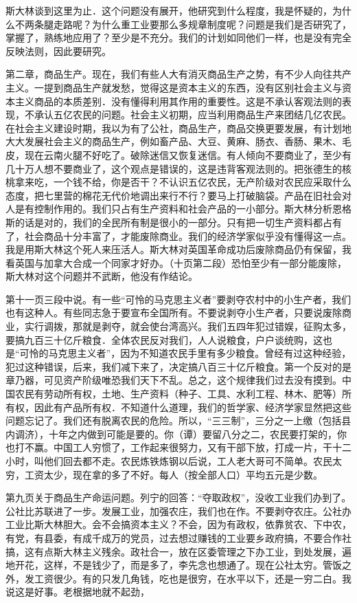 斯大林谈到这里为止．这个问题没有展开，他研究到什么程度，我是怀疑的，为什么不两条腿走路呢？为什么重工业要那么多规章制度呢？问题是我们是否研究了，掌握了，熟练地应用了？至少是不充分。我们的计划如同他们一样，也是没有完全反映法则，因此要研究。

第二章，商品生产。现在，我们有些人大有消灭商品生产之势，有不少人向往共产主义。一提到商品生产就发愁，觉得这是资本主义的东西，没有区别社会主义与资本主义商品的本质差别．没有懂得利用其作用的重要性。这是不承认客观法则的表现，不承认五亿农民的问题。社会主义初期，应当利用商品生产来团结几亿农民。在社会主义建设时期，我以为有了公社，商品生产，商品交换更要发展，有计划地大大发展社会主义的商品生产，例如畜产品、大豆、黄麻、肠衣、香肠、果木、毛皮，现在云南火腿不好吃了。破除迷信又恢复迷信。有人倾向不要商业了，至少有几十万人想不要商业了，这个观点是错误的，这是违背客观法则的。把张德生的核桃拿来吃，一个钱不给，你是否干？不认识五亿农民，无产阶级对农民应采取什么态度，把七里营的棉花无代价地调出来行不行？要马上打破脑袋。产品在旧社会对人是有控制作用的。我们只占有生产资料和社会产品的一小部分。斯大林分析恩格斯的话是对的，我们的全民所有制是很小的一部分。只有把一切生产资料都占有了，社会商品十分丰富了，才能废除商业。我们的经济学家似乎没有懂得这一点。我是用斯大林这个死人来压活人。斯大林对英国革命成功后废除商品仍有保留，我看英国与加拿大合成一个同家才好办。（十页第二段）恐怕至少有一部分能废除，斯大林对这个问题并不武断，他没有作结论。

第十一页三段中说。有一些“可怜的马克思主义者”要剥夺农村中的小生产者，我们也有这种人。有些同志急于要宣布全国所有。不要说剥夺小生产者，只要说废除商业，实行调拨，那就是剥夺，就会使台湾高兴。我们五四年犯过错娱，征购太多，要搞九百三十亿斤粮食．全体农民反对我们，人人说粮食，户户谈统购，这也是“可怜的马克思主义者”，因为不知道农民手里有多少粮食。曾经有过这种经验，犯过这种错误，后来，我们减下来了，决定搞八百三十亿斤粮食。第一个反对的是章乃器，可见资产阶级唯恐我们天下不乱。总之，这个规律我们过去没有摸到。中国农民有劳动所有权，土地、生产资料（种子、工具、水利工程、林木、肥等）所有权，因此有产品所有权．不知道什么道理，我们的哲学家、经济学家显然把这些问题忘记了。我们还有脱离农民的危险。所以，“三三制”，三分之一上缴（包括县内调济），十年之内做到可能是要的。你（谭）要留八分之二，农民要打架的，你也打不赢。中国工人穷惯了，工作起来很努力，又有干部下放，打成一片，干十二小时，叫他们回去都不走。农民炼铁炼钢以后说，工人老大哥可不简单。农民太穷，工资太少，现在拿的多了不好。每人（按全部人口）平均五元是少数。

第九页关于商品生产命运问题。列宁的回答：“夺取政权”，没收工业我们办到了。公社比苏联进了一步。发展工业，加强农庄，我们也在作。不要剥夺农庄。公社办工业比斯大林胆大。会不会搞资本主义？不会，因为有政权，依靠贫农、下中农，有党，有县委，有成千成万的党员，过去想过赚钱的工业要乡政府搞，不要合作社搞，这有点斯大林主义残余。政社合一，放在区委管理之下办工业，到处发展，遍地开花，这样，不是钱少了，而是多了，李先念也想通了。现在公社太穷。管饭之外，发工资很少。有的只发几角钱，吃也是很穷，在水平以下，还是一穷二白。我说这是好事。老根据地就不起劲，

